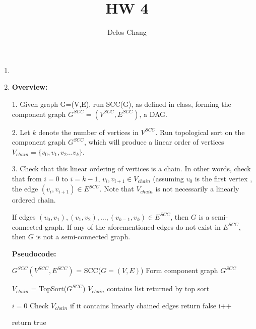 \documentclass[a4paper]{report}
\title{HW 4}
\author{Delos Chang}
\date{}
\begin{document}
  \begin{enumerate}
    \item 


    \par
    \bigskip

    \item 
      {\bf Overview:}

      1. Given graph G=(V,E), run SCC(G), as defined in class, 
      forming the component graph $G^{SCC} = (V^{SCC}, E^{SCC})$, a DAG. 

      2. Let $k$ denote the number of vertices in $V^{SCC}$. Run topological sort on the component graph $G^{SCC}$, 
      which will produce a linear order of vertices $V_{chain} = \{v_{0}, v_{1}, v_{2} \dots v_{k}\}$. 

      3. Check that this linear ordering of vertices is a chain. 
      In other words, check that from $i=0$ to $i=k-1$, $v_{i},v_{i+1} \in V_{chain}$ (assuming $v_{0}$ is the first vertex
      , the edge $(v_{i},v_{i+1}) \in E^{SCC}$.
      Note that $V_{chain}$ is not necessarily a linearly ordered chain.

      If edges $(v_{0}, v_{1}), (v_{1},v_{2}),\dots,(v_{k-1},v_{k}) \in E^{SCC}$, then $G$ is a semi-connected graph.
      If any of the aforementioned edges do not exist in $E^{SCC}$, then $G$ is not a semi-connected graph. 

      {\bf Pseudocode:}

      \begin{algorithmic}[1]

        \State $G^{SCC}(V^{SCC},E^{SCC})$ = SCC($G=(V,E)$)
        \Comment Form component graph $G^{SCC}$

        \State $V_{chain}$ = TopSort($G^{SCC}$)
        \Comment $V_{chain}$ contains list returned by top sort

        \State $i=0$
        \Comment Check $V_{chain}$ if it contains linearly chained edges
            \State return false
          \EndIf
          \State i++

        \EndWhile
        \State return true
      \EndFunction
    \end{algorithmic}


\end{enumerate}
\end{document}
